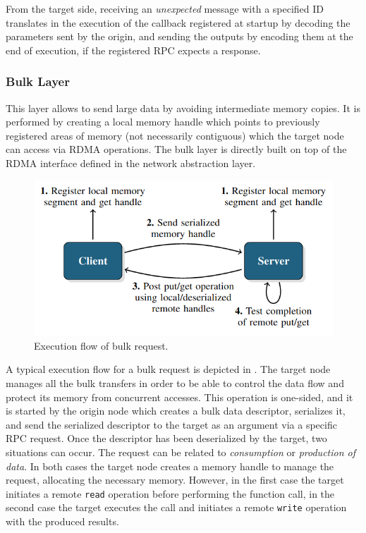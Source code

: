 From the target side, receiving an \textit{unexpected} message with a specified ID translates in the execution of the callback registered at startup by decoding the parameters sent by the origin, and sending the outputs by encoding them at the end of execution, if the registered RPC expects a response.
\subsubsection{Bulk Layer}
This layer allows to send large data by avoiding intermediate memory copies. It is performed by creating a local memory handle which points to previously registered areas of memory (not necessarily contiguous) which the target node can access via RDMA operations. The bulk layer is directly built on top of the RDMA interface defined in the network abstraction layer. \newline

\begin{figure}[H]
    \centering
    \includegraphics[width=0.6\linewidth]{res/bulk-flow.png}
    \caption{Execution flow of bulk request.}
    \label{fig:bulk-flow}
\end{figure}

A typical execution flow for a bulk request is depicted in . The target node manages all the bulk transfers in order to be able to control the data flow and protect its memory from concurrent accesses. This operation is one-sided, and it is started by the origin node which creates a bulk data descriptor, serializes it, and send the serialized descriptor to the target as an argument via a specific RPC request. Once the descriptor has been deserialized by the target, two situations can occur. The request can be related to \textit{consumption} or \textit{production of data}. In both cases the target node creates a memory handle to manage the request, allocating the necessary memory. However, in the first case the target initiates a remote \texttt{read} operation before performing the function call, in the second case the target executes the call and initiates a remote \texttt{write} operation with the produced results.\newline

